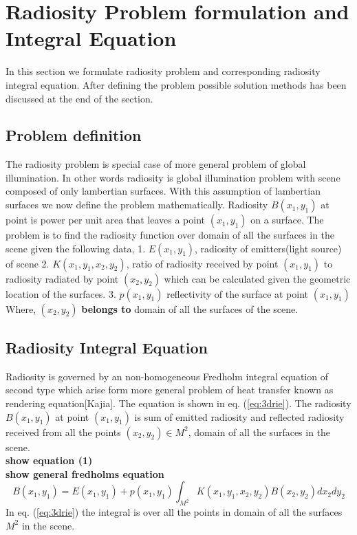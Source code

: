 \documentclass[12pt]{article}
\begin{document}
\section{Radiosity Problem formulation and Integral Equation}

In this section we formulate radiosity problem and corresponding radiosity integral equation. After defining the problem possible solution methods has been discussed at the end of the section.
\subsection{Problem definition}
The radiosity problem is special case of more general problem of global illumination. In other words radiosity is global illumination problem with scene composed of only lambertian surfaces. With this assumption of lambertian surfaces we now define the problem mathematically.
Radiosity $B(x_1,y_1)$ at point is power per unit area that leaves a point $(x_1,y_1)$ on a surface. The problem is to find the radiosity function over domain of all the surfaces in the scene given the following data,
1. $E(x_1,y_1)$, radiosity of emitters(light source) of scene
2. $K(x_1,y_1,x_2,y_2)$, ratio of radiosity received by point $(x_1,y_1)$ to radiosity radiated by point $(x_2,y_2)$  which can be calculated given the geometric location of the surfaces. 
3. $p(x_1,y_1)$ reflectivity of the surface at point $(x_1,y_1)$
Where, $(x_2,y_2)$  {\bf belongs to} domain of all the surfaces of the scene.
\subsection {Radiosity Integral Equation}
Radiosity is governed by an non-homogeneous Fredholm integral equation of second type which arise form more general problem of heat transfer known as rendering equation[Kajia]. The equation is shown in eq. (\ref{eq:3drie}). The radiosity $B(x_1,y_1)$ at point $(x_1,y_1)$  is sum of emitted radiosity and reflected radiosity received from all the points $(x_2,y_2) \in M^2$,  domain of all the surfaces in the scene.\\
{\bf show equation (1)}\\

{\bf show general fredholms equation}\\

\begin{equation} \label{eq:3drie}
B(x_1,y_1)=E(x_1,y_1)+p(x_1,y_1)\int_{M^2}K(x_1,y_1,x_2,y_2)B(x_2,y_2)dx_2dy_2
\end{equation}
In eq. (\ref{eq:3drie}) the integral is over all the points in domain of all  the surfaces $M^2$ in the scene. 
\end{document}
